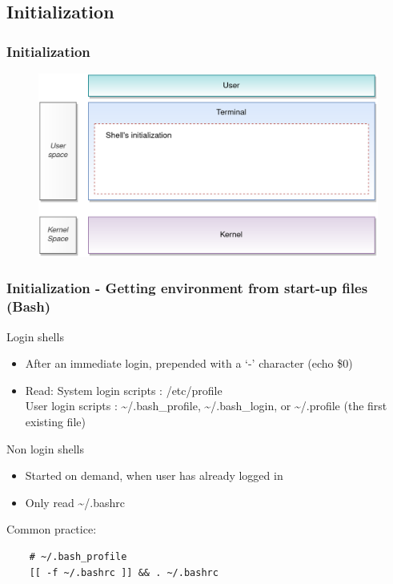 \documentclass[aspectratio=169,10pt]{beamer}
\begin{document}
\subsection{Initialization}

\begin{frame}
  \frametitle{Initialization}
    \begin{figure}[h]
        \includegraphics[scale=0.8]{./images/ShellStepsBeforeInit}
    \end{figure}
\end{frame}

\begin{frame}[fragile]
  \frametitle{Initialization - Getting environment from start-up files (Bash)}
    \small{
        \vspace{\baselineskip}
  Login shells
  \begin{itemize}
    \item After an immediate login, prepended with a `-' character (echo \$0)
    \item Read:
      System login scripts : /etc/profile \\
      User login scripts : \~{}/.bash\_profile, \~{}/.bash\_login, or \~{}/.profile (the first existing file)
  \end{itemize}

  \vspace{\baselineskip}

  Non login shells
  \begin{itemize}
    \item Started on demand, when user has already logged in
    \item Only read \~{}/.bashrc
  \end{itemize}

  \vspace{\baselineskip}

Common practice:

    \begin{lstlisting}
    # ~/.bash_profile
    [[ -f ~/.bashrc ]] && . ~/.bashrc
    \end{lstlisting}
}

\end{frame}
\end{document}
